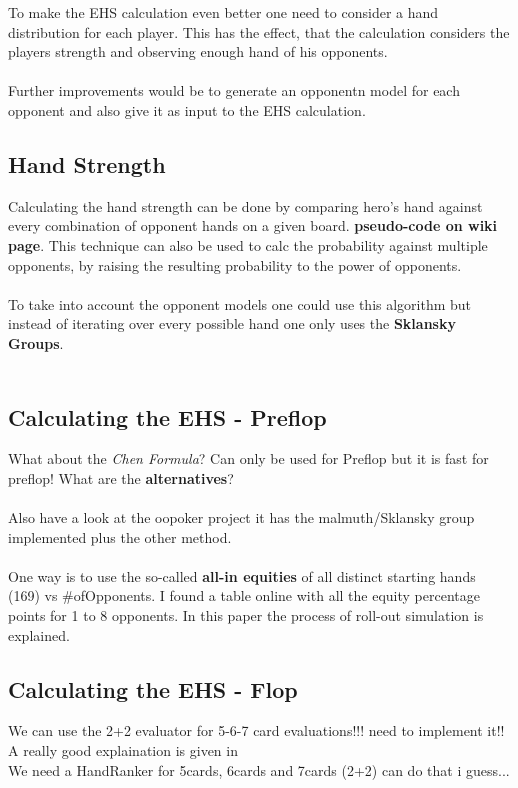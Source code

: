 To make the EHS calculation even better one need to consider a hand distribution for each player. This has the effect, that the calculation considers the players strength and observing enough hand of his opponents.\\\\
Further improvements would be to generate an opponentn model for each opponent and also give it as input to the EHS calculation.

\subsection{Hand Strength}
Calculating the hand strength can be done by comparing hero's hand against every combination of opponent hands on a given board. 
\textbf{pseudo-code on wiki page}. This technique can also be used to calc the probability against multiple opponents, by raising the resulting probability to the power of opponents. \cite{ehs_calc}\\\\

To take into account the opponent models one could use this algorithm but instead of iterating over every possible hand one only uses the \textbf{Sklansky Groups}. \cite{ehs_calc}\\\\
\subsection{Calculating the EHS - Preflop}
What about the \textit{Chen Formula}? Can only be used for Preflop but it is fast for preflop! What are the \textbf{alternatives}?\\\\
Also have a look at the oopoker project it has the malmuth/Sklansky group implemented plus the other method.\\\\
One way is to use the so-called \textbf{all-in equities} of all distinct starting hands (169) vs \#ofOpponents. I found a table online with all the equity percentage points for 1 to 8 opponents. In this paper the process of roll-out simulation is explained. \cite{algo_poker}
\subsection{Calculating the EHS - Flop}
We can use the 2+2 evaluator for 5-6-7 card evaluations!!! need to implement it!!
A really good explaination is given in \cite{opp_mod}\\
We need a HandRanker for 5cards, 6cards and 7cards (2+2) can do that i guess...
